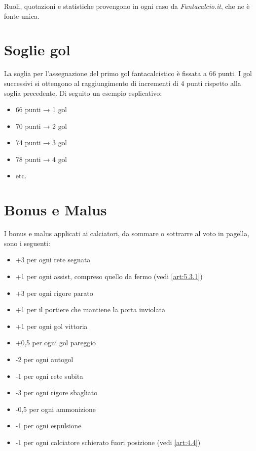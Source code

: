 Ruoli, quotazioni e statistiche provengono in ogni caso da \emph{Fantacalcio.it}, che ne è fonte unica.

\section{Soglie gol}
\label{art:5.2}

La soglia per l'assegnazione del primo gol fantacalcistico è fissata a 66 punti. I gol successivi si ottengono al raggiungimento di incrementi di 4 punti rispetto alla soglia precedente. Di seguito un esempio esplicativo:

\begin{itemize}
    \item 66 punti → 1 gol
    \item 70 punti → 2 gol
    \item 74 punti → 3 gol
    \item 78 punti → 4 gol
    \item etc.
\end{itemize}

\section{Bonus e Malus}
\label{art:5.3}

I bonus e malus applicati ai calciatori, da sommare o sottrarre al voto in pagella, sono i seguenti:

\begin{itemize}
    \item +3 per ogni rete segnata
    \item +1 per ogni assist, compreso quello da fermo (vedi \ref{art:5.3.1})
    \item +3 per ogni rigore parato
    \item +1 per il portiere che mantiene la porta inviolata
    \item +1 per ogni gol vittoria
    \item +0,5 per ogni gol pareggio
    \item -2 per ogni autogol
    \item -1 per ogni rete subita
    \item -3 per ogni rigore sbagliato
    \item -0,5 per ogni ammonizione
    \item -1 per ogni espulsione
    \item -1 per ogni calciatore schierato fuori posizione (vedi \ref{art:4.4})
\end{itemize}

